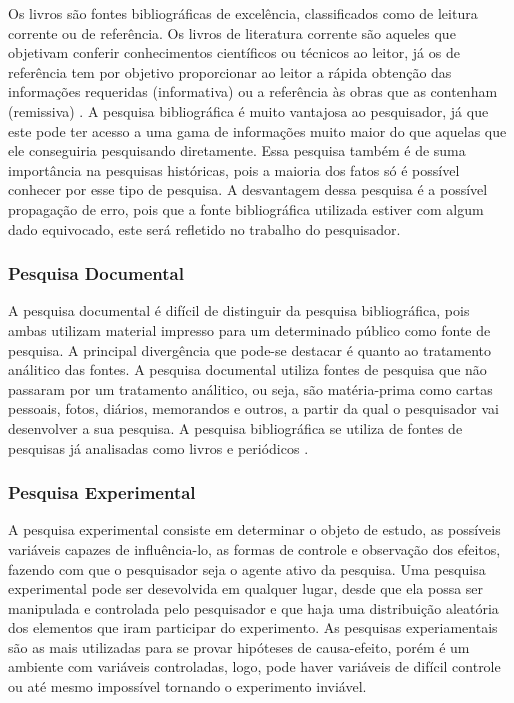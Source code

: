 	Os livros são fontes bibliográficas de excelência, classificados como de leitura corrente ou de referência. Os livros de literatura corrente são aqueles que objetivam conferir conhecimentos científicos ou técnicos ao leitor, já os de referência tem por objetivo proporcionar ao leitor a rápida obtenção das informações requeridas (informativa) ou a referência às obras que as contenham (remissiva) \cite{ac2002elaborar}.  
A pesquisa bibliográfica é muito vantajosa ao pesquisador, já que este pode ter acesso a uma gama de informações muito maior do que aquelas que ele conseguiria pesquisando diretamente. Essa pesquisa também é de suma importância na pesquisas históricas, pois a maioria dos fatos só é possível conhecer por esse tipo de pesquisa.
A desvantagem dessa pesquisa é a possível propagação de erro, pois que a fonte bibliográfica utilizada estiver com algum dado equivocado, este será refletido no trabalho do pesquisador.	
\subsubsection{Pesquisa Documental}
A pesquisa documental é difícil de distinguir da pesquisa bibliográfica, pois ambas utilizam material impresso para um determinado público como fonte de pesquisa. A principal divergência que pode-se destacar é quanto ao tratamento análitico das fontes. A pesquisa documental utiliza fontes de pesquisa que não passaram por um tratamento análitico, ou seja, são matéria-prima como cartas pessoais, fotos, diários, memorandos e outros, a partir da qual o pesquisador vai desenvolver a sua pesquisa. A pesquisa bibliográfica se utiliza de fontes de pesquisas já analisadas como livros e periódicos \cite{ac2002elaborar}.
\subsubsection{Pesquisa Experimental}
A pesquisa experimental consiste em determinar o objeto de estudo, as possíveis variáveis capazes de influência-lo, as formas de controle e observação dos efeitos, fazendo com que o pesquisador seja o agente ativo da pesquisa. Uma pesquisa experimental pode ser desevolvida em qualquer lugar, desde que ela possa ser manipulada e controlada pelo pesquisador e que haja uma distribuição aleatória dos elementos que iram participar do experimento. As pesquisas experiamentais são as mais utilizadas para se provar hipóteses de causa-efeito, porém é um ambiente com variáveis controladas, logo, pode haver variáveis de difícil controle ou até mesmo impossível tornando o experimento inviável. \cite{ac2002elaborar}
